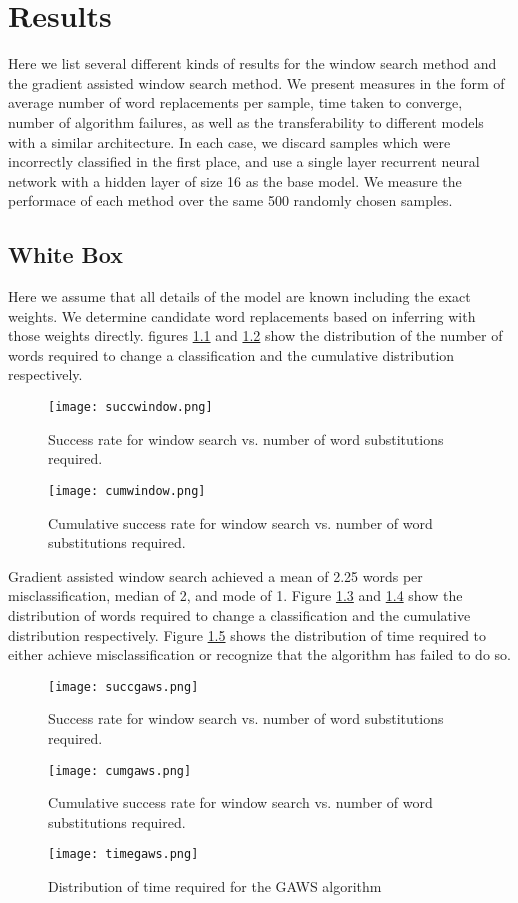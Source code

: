 \chapter{Results}
Here we list several different kinds of results for the window search method and the gradient assisted window search method.  We present measures in the form of average number of word replacements per sample, time taken to converge, number of algorithm failures, as well as the transferability to different models with a similar architecture.  In each case, we discard samples which were incorrectly classified in the first place, and use a single layer recurrent neural network with a hidden layer of size 16 as the base model.  We measure the performace of each method over the same 500 randomly chosen samples.  

\section{White Box}
Here we assume that all details of the model are known including the exact weights.  We determine candidate word replacements based on inferring with those weights directly.  figures \ref{fig:succwindow} and \ref{fig:cumwindow} show the distribution of the number of words required to change a classification and the cumulative distribution respectively.
\begin{figure}
    \centering
    \texttt{[image: succwindow.png]}
    \caption{Success rate for window search vs. number of word substitutions required.}
    \label{fig:succwindow}
\end{figure}
\begin{figure}
    \centering
    \texttt{[image: cumwindow.png]}
    \caption{Cumulative success rate for window search vs. number of word substitutions required.}
    \label{fig:cumwindow}
\end{figure}

Gradient assisted window search achieved a mean of 2.25 words per misclassification, median of 2, and mode of 1.  Figure \ref{fig:succgaws} and \ref{fig:cumgaws} show the distribution of words required to change a classification and the cumulative distribution respectively.  Figure \ref{fig:timegaws} shows the distribution of time required to either achieve misclassification or recognize that the algorithm has failed to do so.
\begin{figure}
    \centering
    \texttt{[image: succgaws.png]}
    \caption{Success rate for window search vs. number of word substitutions required.}
    \label{fig:succgaws}
\end{figure}
\begin{figure}
    \centering
    \texttt{[image: cumgaws.png]}
    \caption{Cumulative success rate for window search vs. number of word substitutions required.}
    \label{fig:cumgaws}
\end{figure}
\begin{figure}
    \centering
    \texttt{[image: timegaws.png]}
    \caption{Distribution of time required for the GAWS algorithm}
    \label{fig:timegaws}
\end{figure}

